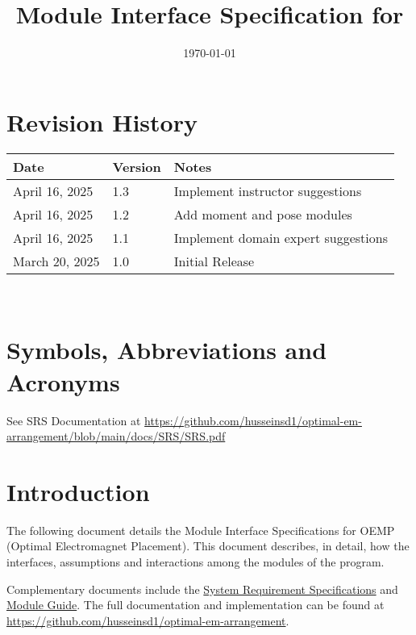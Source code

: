 \documentclass[12pt, titlepage]{article}
\begin{document}
\title{Module Interface Specification for \progname{}}

\author{\authname}

\date{\today}

\maketitle


\section{Revision History}

\begin{tabularx}{\textwidth}{p{3cm}p{2cm}X}
\toprule {\bf Date} & {\bf Version} & {\bf Notes}\\
\midrule
April 16, 2025 & 1.3 & Implement instructor suggestions\\
\midrule
April 16, 2025 & 1.2 & Add moment and pose modules\\
\midrule
April 16, 2025 & 1.1 & Implement domain expert suggestions\\
\midrule
March 20, 2025 & 1.0 & Initial Release\\
\bottomrule
\end{tabularx}

~\newpage

\section{Symbols, Abbreviations and Acronyms}

See SRS Documentation at \url{https://github.com/husseinsd1/optimal-em-arrangement/blob/main/docs/SRS/SRS.pdf}
\newpage

\tableofcontents

\newpage


\section{Introduction}

The following document details the Module Interface Specifications for
OEMP (Optimal Electromagnet Placement). This document describes, in detail, how the interfaces, assumptions and interactions among the modules of the program. 

Complementary documents include the \href{https://github.com/husseinsd1/optimal-em-arrangement/blob/main/docs/SRS/SRS.pdf}{System Requirement Specifications} and \href{https://github.com/husseinsd1/optimal-em-arrangement/blob/main/docs/Design/SoftArchitecture/MG.pdf}{Module Guide}. The full documentation and implementation can be
found at \url{https://github.com/husseinsd1/optimal-em-arrangement}.
\end{document}
